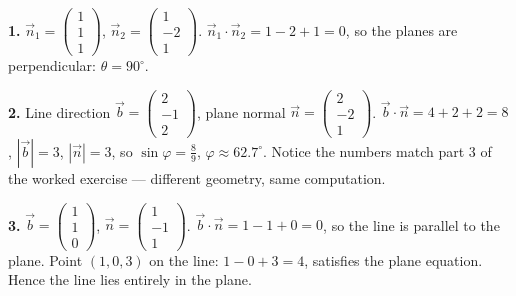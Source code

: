 \documentclass[11pt]{article}
\begin{document}
\begin{corrige}[Exercise 1]
\textbf{1.} $\vec{n}_1=\begin{pmatrix}1\\1\\1\end{pmatrix}$, $\vec{n}_2=\begin{pmatrix}1\\-2\\1\end{pmatrix}$. $\vec{n}_1\cdot\vec{n}_2=1-2+1=0$, so the planes are perpendicular: $\theta=90^{\circ}$.

\textbf{2.} Line direction $\vec{b}=\begin{pmatrix}2\\-1\\2\end{pmatrix}$, plane normal $\vec{n}=\begin{pmatrix}2\\-2\\1\end{pmatrix}$. $\vec{b}\cdot\vec{n}=4+2+2=8$, $|\vec{b}|=3$, $|\vec{n}|=3$, so $\sin\varphi=\tfrac{8}{9}$, $\varphi\approx 62.7^{\circ}$. Notice the numbers match part 3 of the worked exercise — different geometry, same computation.

\textbf{3.} $\vec{b}=\begin{pmatrix}1\\1\\0\end{pmatrix}$, $\vec{n}=\begin{pmatrix}1\\-1\\1\end{pmatrix}$. $\vec{b}\cdot\vec{n}=1-1+0=0$, so the line is parallel to the plane. Point $(1,0,3)$ on the line: $1-0+3=4$, satisfies the plane equation. Hence the line lies entirely in the plane.


\end{corrige}
\end{document}
